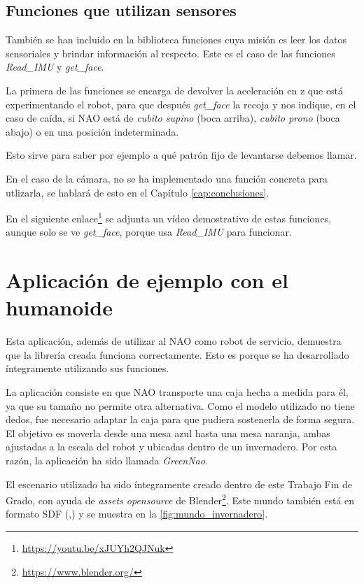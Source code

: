\subsection{Funciones que utilizan sensores} \label{subsec:sensores}

También se han incluido en la biblioteca funciones cuya misión es leer los datos sensoriales y brindar información al respecto. Este es el caso de las funciones \textit{Read\_IMU} y \textit{get\_face}.

La primera de las funciones se encarga de devolver la aceleración en z que está experimentando el robot, para que después \textit{get\_face} la recoja y nos indique, en el caso de caída, si NAO está de \textit{cubito supino} (boca arriba), \textit{cubito prono} (boca abajo) o en una posición indeterminada.

Esto sirve para saber por ejemplo a qué patrón fijo de levantarse debemos llamar.

En el caso de la cámara, no se ha implementado una función concreta para utlizarla, se hablará de esto en el Capítulo \ref{cap:conclusiones}. 

En el siguiente enlace\footnote{\url{https://youtu.be/xJUYh2QJNuk}} se adjunta un vídeo demostrativo de estas funciones, aunque solo se ve \textit{get\_face}, porque usa \textit{Read\_IMU} para funcionar.

\section{Aplicación de ejemplo con el humanoide} \label{sec:aplicacion}

Esta aplicación, además de utilizar al NAO como robot de servicio, demuestra que la librería creada funciona correctamente. Esto es porque se ha desarrollado íntegramente utilizando sus funciones.

La aplicación consiste en que NAO transporte una caja hecha a medida para él, ya que su tamaño no permite otra alternativa. Como el modelo utilizado no tiene dedos, fue necesario adaptar la caja para que pudiera sostenerla de forma segura. El objetivo es moverla desde una mesa azul hasta una mesa naranja, ambas ajustadas a la escala del robot y ubicadas dentro de un invernadero. Por esta razón, la aplicación ha sido llamada \textit{GreenNao}.

El escenario utilizado ha sido íntegramente creado dentro de este Trabajo Fin de Grado, con ayuda de \textit{assets opensource} de Blender\footnote{\url{https://www.blender.org/}}. Este mundo también está en formato SDF (\cite{tutorial_mallas},\cite{parametros_fisicos_gazebo}) y se muestra en la \autoref{fig:mundo_invernadero}.

